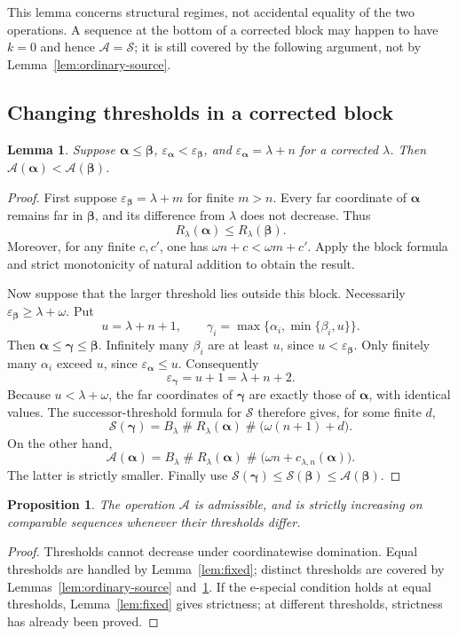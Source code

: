 \documentclass[11pt,letterpaper]{article}
\newtheorem{lemma}[theorem]{Lemma}
\newtheorem{proposition}[theorem]{Proposition}
\theoremstyle{definition}
\theoremstyle{remark}
\newcommand{\Sop}{\mathcal S}
\newcommand{\Aop}{\mathcal A}
\newcommand{\seq}[1]{\boldsymbol{#1}}
\newcommand{\ns}{\mathbin{\#}}
\newcommand{\epsa}{\varepsilon_{\seq\alpha}}
\newcommand{\epsb}{\varepsilon_{\seq\beta}}
\begin{document}
This lemma concerns structural regimes, not accidental equality of the two operations. A sequence at the bottom of a corrected block may happen to have $k=0$ and hence $\Aop=\Sop$; it is still covered by the following argument, not by Lemma~\ref{lem:ordinary-source}.

\subsection{Changing thresholds in a corrected block}

\begin{lemma}\label{lem:corrected-source}
Suppose $\seq\alpha\le\seq\beta$, $\epsa<\epsb$, and $\epsa=\lambda+n$ for a corrected $\lambda$. Then $\Aop(\seq\alpha)<\Aop(\seq\beta)$.
\end{lemma}
\begin{proof}
First suppose $\epsb=\lambda+m$ for finite $m>n$. Every far coordinate of $\seq\alpha$ remains far in $\seq\beta$, and its difference from $\lambda$ does not decrease. Thus
\[
 R_\lambda(\seq\alpha)\le R_\lambda(\seq\beta).
\]
Moreover, for any finite $c,c'$, one has $\omega n+c<\omega m+c'$. Apply the block formula and strict monotonicity of natural addition to obtain the result.

Now suppose that the larger threshold lies outside this block. Necessarily $\epsb\ge\lambda+\omega$. Put
\[
 u=\lambda+n+1,\qquad
 \gamma_i=\max\{\alpha_i,\min\{\beta_i,u\}\}.
\]
Then $\seq\alpha\le\seq\gamma\le\seq\beta$. Infinitely many $\beta_i$ are at least $u$, since $u<\epsb$. Only finitely many $\alpha_i$ exceed $u$, since $\epsa\le u$. Consequently
\[
 \varepsilon_{\seq\gamma}=u+1=\lambda+n+2.
\]
Because $u<\lambda+\omega$, the far coordinates of $\seq\gamma$ are exactly those of $\seq\alpha$, with identical values. The successor-threshold formula for $\Sop$ therefore gives, for some finite $d$,
\[
 \Sop(\seq\gamma)=B_\lambda\ns R_\lambda(\seq\alpha)
                   \ns\bigl(\omega(n+1)+d\bigr).
\]
On the other hand,
\[
 \Aop(\seq\alpha)=B_\lambda\ns R_\lambda(\seq\alpha)
                   \ns\bigl(\omega n+c_{\lambda,n}(\seq\alpha)\bigr).
\]
The latter is strictly smaller. Finally use
$\Sop(\seq\gamma)\le\Sop(\seq\beta)\le\Aop(\seq\beta)$.
\end{proof}

\begin{proposition}\label{prop:admissible}
The operation $\Aop$ is admissible, and is strictly increasing on comparable sequences whenever their thresholds differ.
\end{proposition}
\begin{proof}
Thresholds cannot decrease under coordinatewise domination. Equal thresholds are handled by Lemma~\ref{lem:fixed}; distinct thresholds are covered by Lemmas~\ref{lem:ordinary-source} and~\ref{lem:corrected-source}. If the e-special condition holds at equal thresholds, Lemma~\ref{lem:fixed} gives strictness; at different thresholds, strictness has already been proved.
\end{proof}
\end{document}
